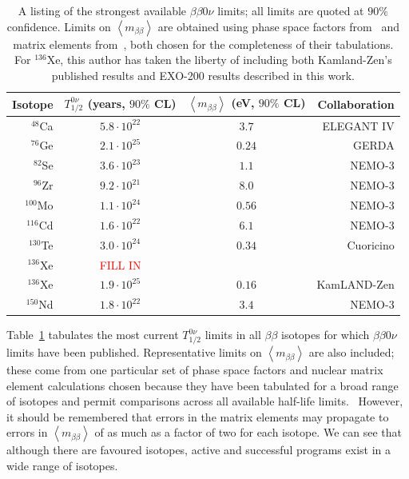 \begin{table}
\begin{center}
\begin{tabular}{|rccr|}
\hline Isotope & $T_{1/2}^{0\nu}$ (years, $90\%$ CL) & $\left<m_{\beta\beta}\right>$ (eV, $90\%$ CL) & Collaboration \\ \hline
$^{48}$Ca & $5.8 \cdot 10^{22}$ & $3.7$ & ELEGANT IV \cite{ElegantIV}\\
$^{76}$Ge & $2.1 \cdot 10^{25}$ & $0.24$ & GERDA \cite{PhysRevLett.111.122503} \\
$^{82}$Se & $3.6 \cdot 10^{23}$ & $1.1$ & NEMO-3 \cite{NEMO2011RandomOtherIsotopes}\\
$^{96}$Zr & $9.2 \cdot 10^{21}$ & $8.0$ & NEMO-3 \cite{Argyriades2010168}\\
$^{100}$Mo & $1.1 \cdot 10^{24}$ & $0.56$ & NEMO-3 \cite{NEMO3-2013-100Mo}\\
$^{116}$Cd & $1.6 \cdot 10^{22}$ & $6.1$ & NEMO-3 \cite{NEMO2011RandomOtherIsotopes}\\
$^{130}$Te & $3.0 \cdot 10^{24}$ & $0.34$ & Cuoricino \cite{PhysRevC.78.035502}\\
$^{136}$Xe & \textcolor{red}{FILL IN} & & \\
$^{136}$Xe & $1.9 \cdot 10^{25}$ & $0.16$ & KamLAND-Zen \cite{PhysRevLett.110.062502}\\
$^{150}$Nd & $1.8 \cdot 10^{22}$ & $3.4$ & NEMO-3 \cite{PhysRevC.80.032501}\\
\hline
\end{tabular}
\end{center}
\caption{A listing of the strongest available $\beta\beta 0\nu$ limits; all limits are quoted at $90\%$ confidence.  Limits on $\left<m_{\beta\beta}\right>$ are obtained using phase space factors from~\cite{PhysRevC.85.034316} and matrix elements from~\cite{PhysRevLett.109.042501}, both chosen for the completeness of their tabulations.  For $^{136}$Xe, this author has taken the liberty of including both Kamland-Zen's published results and EXO-200 results described in this work.}
\label{tab:0nubb_limits}
\end{table}

Table~\ref{tab:0nubb_limits} tabulates the most current $T_{1/2}^{0\nu}$ limits in all $\beta\beta$ isotopes for which $\beta\beta 0\nu$ limits have been published.  Representative limits on $\left< m_{\beta\beta}\right>$ are also included; these come from one particular set of phase space factors and nuclear matrix element calculations chosen because they have been tabulated for a broad range of isotopes and permit comparisons across all available half-life limits.~\cite{PhysRevC.85.034316,PhysRevLett.109.042501}  However, it should be remembered that errors in the matrix elements may propagate to errors in $\left< m_{\beta\beta}\right>$ of as much as a factor of two for each isotope.  We can see that although there are favoured isotopes, active and successful programs exist in a wide range of isotopes.

